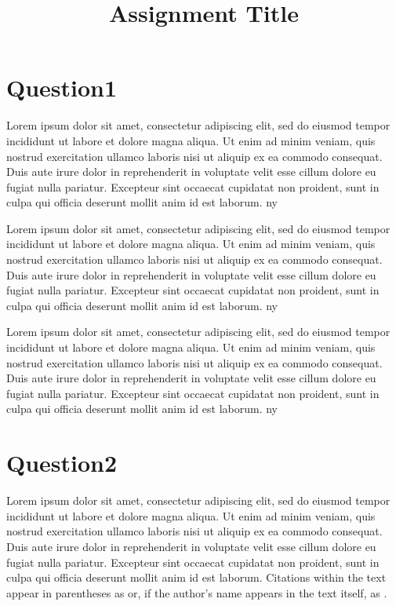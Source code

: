 \documentclass[
    12pt	%
    ]{article}
\title{Assignment Title}
\begin{document}
  

\maketitle

\settowidth{\parindent}{~~~~~}

\tableofcontents
\listoffigures
\listoftables

\section{Question1}
Lorem ipsum dolor sit amet, consectetur adipiscing elit, sed do
eiusmod tempor incididunt ut labore et dolore magna aliqua. Ut enim ad
minim veniam, quis nostrud exercitation ullamco laboris nisi ut
aliquip ex ea commodo consequat. Duis aute irure dolor in
reprehenderit in voluptate velit esse cillum dolore eu fugiat nulla
pariatur. Excepteur sint occaecat cupidatat non proident, sunt in
culpa qui officia deserunt mollit anim id est laborum. \ac{ny}

Lorem ipsum dolor sit amet, consectetur adipiscing elit, sed do
eiusmod tempor incididunt ut labore et dolore magna aliqua. Ut enim ad
minim veniam, quis nostrud exercitation ullamco laboris nisi ut
aliquip ex ea commodo consequat. Duis aute irure dolor in
reprehenderit in voluptate velit esse cillum dolore eu fugiat nulla
pariatur. Excepteur sint occaecat cupidatat non proident, sunt in
culpa qui officia deserunt mollit anim id est laborum. \ac{ny}

Lorem ipsum dolor sit amet, consectetur adipiscing elit, sed do
eiusmod tempor incididunt ut labore et dolore magna aliqua. Ut enim ad
minim veniam, quis nostrud exercitation ullamco laboris nisi ut
aliquip ex ea commodo consequat. Duis aute irure dolor in
reprehenderit in voluptate velit esse cillum dolore eu fugiat nulla
pariatur. Excepteur sint occaecat cupidatat non proident, sunt in
culpa qui officia deserunt mollit anim id est laborum. \ac{ny}

\section{Question2}
Lorem ipsum dolor sit amet, consectetur adipiscing elit, sed do
eiusmod tempor incididunt ut labore et dolore magna aliqua. Ut enim ad
minim veniam, quis nostrud exercitation ullamco laboris nisi ut
aliquip ex ea commodo consequat. Duis aute irure dolor in
reprehenderit in voluptate velit esse cillum dolore eu fugiat nulla
pariatur. Excepteur sint occaecat cupidatat non proident, sunt in
culpa qui officia deserunt mollit anim id est laborum. Citations
within the text appear in parentheses as \citep{zorlu2005effect} or,
if the author’s name appears in the text itself, as
\citet{zorlu2005effect}.
\end{document}
